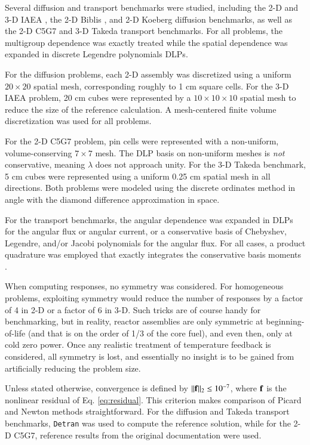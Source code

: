 Several diffusion and transport benchmarks were studied, 
including the 2-D and 3-D IAEA \cite{anl1977benchmark}, the 2-D 
Biblis \cite{muller1991bmd}, and 2-D Koeberg diffusion benchmarks, as well 
as the 2-D C5G7 \cite{lewis2001bsd} 
and 3-D Takeda \cite{takeda1991ntb} transport benchmarks.
For all problems, the multigroup dependence was exactly treated while the 
spatial dependence was expanded in discrete Legendre polynomials 
\cite{mosher2006ifr, roberts2014arm} DLPs.  

For the diffusion 
problems, each 2-D assembly was discretized 
using a uniform $20\times 20$ spatial mesh, corresponding roughly to 
1 cm square cells.  For the 3-D IAEA problem, 20 cm cubes were 
represented by a $10 \times 10 \times 10$ spatial mesh to reduce 
the size of the reference calculation.   A mesh-centered finite 
volume discretization was used for all problems.

For the 2-D C5G7 problem, pin cells were represented with 
a non-uniform, volume-conserving $7\times 7$ 
mesh.   The DLP basis on non-uniform meshes is {\it not} 
conservative, meaning $\lambda$ does not approach unity.
For the 3-D Takeda benchmark, 5 cm 
cubes were represented using a uniform 0.25 cm spatial mesh in 
all directions.  Both problems were modeled using the discrete ordinates 
method in angle with the diamond difference
approximation in space.

For the transport benchmarks, the angular dependence was expanded 
in DLPs for the angular flux or 
angular current, or a conservative basis of Chebyshev, Legendre, 
and/or Jacobi polynomials \cite{roberts2014arm, zhang2012ehs} 
for the angular flux.  For all cases, a product quadrature was employed 
that exactly integrates the conservative basis moments \cite{roberts2014arm}.

When computing responses, no symmetry was considered.  For homogeneous
problems, exploiting symmetry would reduce the number of responses 
by a factor of 4 in 2-D or a factor of 6 in 3-D.  Such tricks are 
of course handy for benchmarking, but in reality, reactor assemblies 
are only symmetric at beginning-of-life (and that is on the order 
of 1/3 of the core fuel), and even then, only at cold zero power.  Once
any realistic treatment of temperature feedback is considered, all 
symmetry is lost, and essentially no insight is to be gained 
from artificially reducing the problem size.

Unless stated otherwise, 
convergence is defined by $||\mathbf{f}||_2 \leq 10^{-7}$, where
$\mathbf{f}$ is the nonlinear residual of Eq. \ref{eq:residual}.
This criterion makes comparison of Picard and Newton methods  
straightforward.   For the diffusion and Takeda transport 
benchmarks, {\tt Detran} was used to compute the reference solution, 
while for the 2-D C5G7, reference results from the original 
documentation were used.

